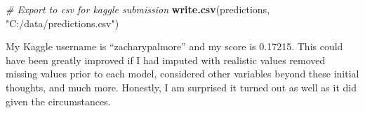 \documentclass[
]{article}
\newenvironment{Shaded}{\begin{snugshade}}{\end{snugshade}}
\newcommand{\CommentTok}[1]{\textcolor[rgb]{0.56,0.35,0.01}{\textit{#1}}}
\newcommand{\KeywordTok}[1]{\textcolor[rgb]{0.13,0.29,0.53}{\textbf{#1}}}
\newcommand{\NormalTok}[1]{#1}
\newcommand{\StringTok}[1]{\textcolor[rgb]{0.31,0.60,0.02}{#1}}
\begin{document}
\begin{Shaded}
\begin{Highlighting}[]
\CommentTok{# Export to csv for kaggle submission }
\KeywordTok{write.csv}\NormalTok{(predictions, }\StringTok{"C:/data/predictions.csv"}\NormalTok{)}
\end{Highlighting}
\end{Shaded}

My Kaggle username is ``zacharypalmore'' and my score is 0.17215. This
could have been greatly improved if I had imputed with realistic values
removed missing values prior to each model, considered other variables
beyond these initial thoughts, and much more. Honestly, I am surprised
it turned out as well as it did given the circumstances.
\end{document}
